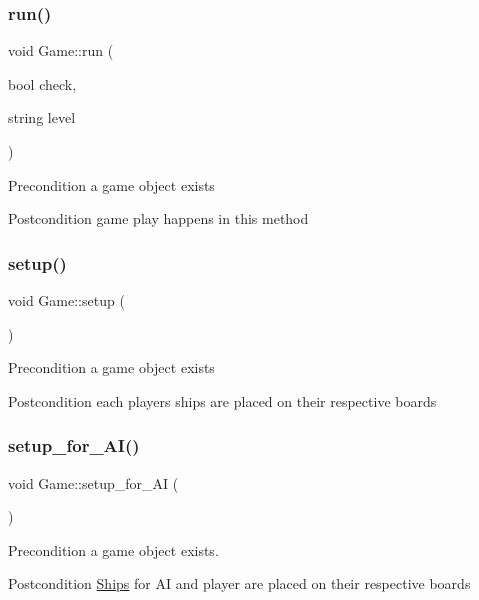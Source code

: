 \subsubsection{\texorpdfstring{run()}{run()}}
{\footnotesize\ttfamily void Game\+::run (\begin{DoxyParamCaption}\item[{bool}]{check,  }\item[{string}]{level }\end{DoxyParamCaption})}

\begin{DoxyPrecond}{Precondition}
a game object exists 
\end{DoxyPrecond}
\begin{DoxyPostcond}{Postcondition}
game play happens in this method 
\end{DoxyPostcond}
\mbox{\label{classGame_ae4618ba40eabbbe65e35f1bb239aa29b}} 
\subsubsection{\texorpdfstring{setup()}{setup()}}
{\footnotesize\ttfamily void Game\+::setup (\begin{DoxyParamCaption}{ }\end{DoxyParamCaption})}

\begin{DoxyPrecond}{Precondition}
a game object exists 
\end{DoxyPrecond}
\begin{DoxyPostcond}{Postcondition}
each players\textquotesingle{} ships are placed on their respective boards 
\end{DoxyPostcond}
\mbox{\label{classGame_ac80d671e53e3ed537fbf7a62d9d56f38}} 
\subsubsection{\texorpdfstring{setup\+\_\+for\+\_\+\+A\+I()}{setup\_for\_AI()}}
{\footnotesize\ttfamily void Game\+::setup\+\_\+for\+\_\+\+AI (\begin{DoxyParamCaption}{ }\end{DoxyParamCaption})}

\begin{DoxyPrecond}{Precondition}
a game object exists. 
\end{DoxyPrecond}
\begin{DoxyPostcond}{Postcondition}
\hyperlink{classShips}{Ships} for AI and player are placed on their respective boards 
\end{DoxyPostcond}
\mbox{\label{classGame_ac57ba0f34e5e9c3d555604e752be376b}} 

